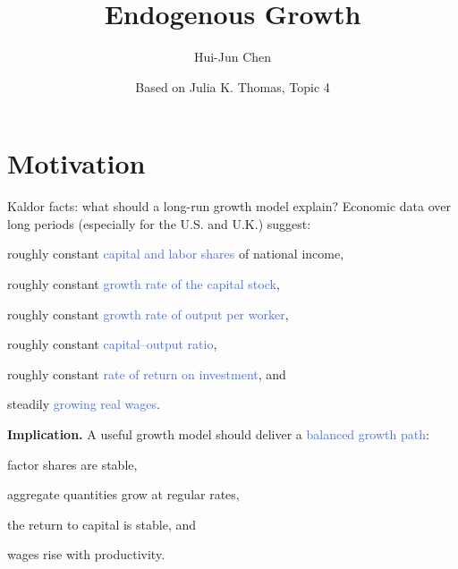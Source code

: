 \documentclass[aspectratio=169,xcolor=dvipsnames]{beamer}
\title[Endogenous Growth]{Endogenous Growth}
\author[Hui-Jun Chen]{Hui-Jun Chen}
\institute[]{National Tsing Hua University\\Department of Economics}
\date{Based on Julia K. Thomas, Topic 4}
\let\tempone\itemize
\let\temptwo\enditemize
\renewenvironment{itemize}{\tempone\addtolength{\itemsep}{\fill}}{\temptwo}
\let\tempa\enumerate
\let\tempb\endenumerate
\renewenvironment{enumerate}{\tempa\addtolength{\itemsep}{\fill}}{\tempb}
\providecommand{\blue}[1]{\textcolor{RoyalBlue}{#1}}
\begin{document}
\begin{frame}
    \titlepage
\end{frame}

\section{Motivation}

\begin{frame}{Kaldor facts: what should a long-run growth model explain?}
\small
Economic data over long periods (especially for the U.S. and U.K.) suggest:
\begin{enumerate}
    \item roughly constant \blue{capital and labor shares} of national income,
    \item roughly constant \blue{growth rate of the capital stock},
    \item roughly constant \blue{growth rate of output per worker},
    \item roughly constant \blue{capital--output ratio},
    \item roughly constant \blue{rate of return on investment}, and
    \item steadily \blue{growing real wages}.
\end{enumerate}

\vspace{0.4em}
\textbf{Implication.} A useful growth model should deliver a \blue{balanced growth path}: 
\begin{itemize}
    \item factor shares are stable,
    \item aggregate quantities grow at regular rates,
    \item the return to capital is stable, and
    \item wages rise with productivity.
\end{itemize}
\end{frame}
\end{document}

